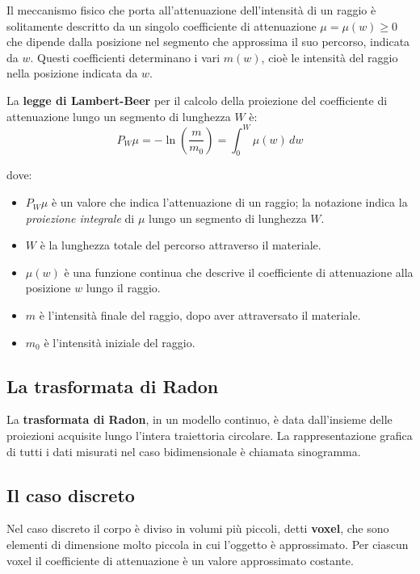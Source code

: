 \documentclass[12pt,a4paper]{report}
\begin{document}
Il meccanismo fisico che porta all'attenuazione dell'intensità di un raggio è solitamente descritto da un singolo coefficiente di
attenuazione \(\mu = \mu(w) \ge 0\) che dipende dalla posizione nel segmento che approssima il suo percorso, indicata da \(w\).
Questi coefficienti determinano i vari \(m(w)\), cioè le intensità del raggio nella posizione indicata da \(w\).

La \textbf{legge di Lambert-Beer} per il calcolo della proiezione del coefficiente di attenuazione lungo un segmento di lunghezza
\(W\) è:
\begin{equation} \label{eq:law_lambert-beer}
  P_W\mu = - \ln{(\frac{m}{m_0})} = \int_0^W \mu(w) \, dw
\end{equation}

dove:
\begin{itemize}
  \item \(P_W\mu\) è un valore che indica l'attenuazione di un raggio; la notazione indica la \textit{proiezione integrale} di
        \(\mu\) lungo un segmento di lunghezza \(W\).
  \item \(W\) è la lunghezza totale del percorso attraverso il materiale.
  \item \(\mu(w)\) è una funzione continua che descrive il coefficiente di attenuazione alla posizione \(w\) lungo il raggio.
  \item \(m\) è l'intensità finale del raggio, dopo aver attraversato il materiale.
  \item \(m_0\) è l'intensità iniziale del raggio.
\end{itemize}

\subsection{La trasformata di Radon}

La \textbf{trasformata di Radon}, in un modello continuo, è data dall'insieme delle proiezioni acquisite lungo l'intera
traiettoria circolare.
La rappresentazione grafica di tutti i dati misurati nel caso bidimensionale è chiamata sinogramma.

\subsection{Il caso discreto}

Nel caso discreto il corpo è diviso in volumi più piccoli, detti \textbf{voxel}, che sono elementi di dimensione molto piccola in
cui l'oggetto è approssimato.
Per ciascun voxel il coefficiente di attenuazione è un valore approssimato costante.
\end{document}
